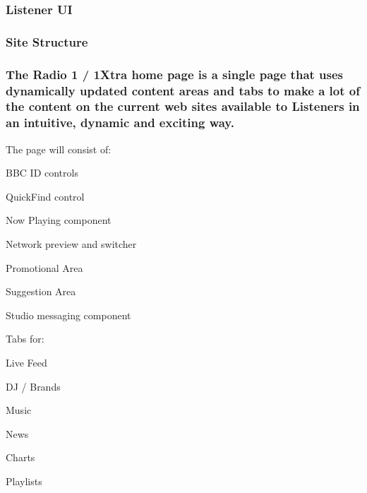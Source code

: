 \documentclass[a4paper, 11pt]{scrreprt}
\begin{document}
\subsubsection{Listener UI}
\label{h.ytaf9vwy4xeh}

\subsubsection{Site Structure}
\label{h.r6ulgjtmbi2l}

\subsubsection{The Radio 1 / 1Xtra home page is a single page that uses dynamically updated content areas and tabs to make a lot of the content on the current web sites available to Listeners in an intuitive, dynamic and exciting way.}
\label{h.v35p0vz1wg6y}
The page will consist of:



\begin{tystrul}


\item BBC ID controls

\item QuickFind control

\item Now Playing component

\item Network preview and switcher

\item Promotional Area

\item Suggestion Area

\item Studio messaging component

\item Tabs for:

\begin{tystrul}


\item Live Feed

\item DJ / Brands

\item Music

\item News

\item Charts

\item Playlists

\end{tystrul}



\end{tystrul}
\end{document}
